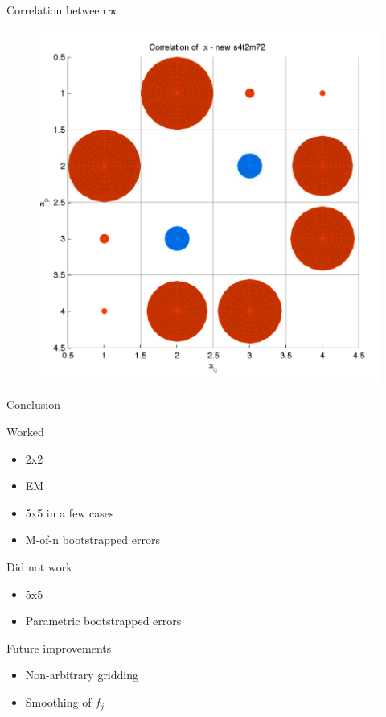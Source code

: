 \documentclass{beamer}
\newcommand{\vect}[1]{\boldsymbol{\mathbf{#1}}}
\newcommand{\vp}{\vect{\pi}}
\begin{document}
\begin{frame}{Correlation between $\vp$}
	
	
	
	\begin{figure}
			\begin{center}
				\includegraphics[scale=0.5]{correlgrid2.pdf}
			\end{center}
	\end{figure}	
	
\end{frame}








\begin{frame}{Conclusion}
	
	Worked
	\begin{itemize}
		\item 2x2
		\item EM
		\item 5x5 in a few cases
		\item M-of-n bootstrapped errors
	\end{itemize}	
	
	Did not work
	\begin{itemize}
		\item 5x5
		\item Parametric bootstrapped errors
	\end{itemize}	
	
	
	Future improvements
	\begin{itemize}
		\item Non-arbitrary gridding
		\item Smoothing of $f_j$
	\end{itemize}	
	
\end{frame}
\end{document}
